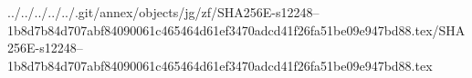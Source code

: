 ../../../../../.git/annex/objects/jg/zf/SHA256E-s12248--1b8d7b84d707abf84090061c465464d61ef3470adcd41f26fa51be09e947bd88.tex/SHA256E-s12248--1b8d7b84d707abf84090061c465464d61ef3470adcd41f26fa51be09e947bd88.tex